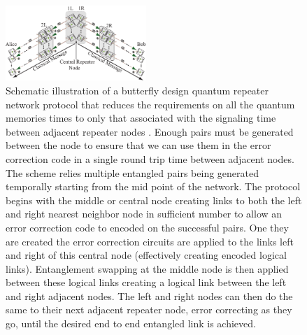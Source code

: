 \documentclass[twocolumn, aps, rmp, amsmath, amssymb, nofootinbib, superscriptaddress, longbibliography, floatfix, table-of-contents, eqsecnum]{revtex4-1}
\begin{document}
\begin{figure}[!htb]
\begin{center}
\includegraphics[width=0.475\textwidth]{repeaters_8}
\end{center}
\caption{
Schematic illustration of a butterfly design quantum repeater network protocol that reduces the requirements on all the quantum memories times  to only that associated with the signaling time between adjacent repeater nodes \cite{munro10}. Enough pairs must be generated between the node to ensure that we can use them in the error correction code in a single round trip time between adjacent nodes. The scheme relies multiple entangled pairs being generated temporally starting from the mid point of the network. The protocol begins with the middle or central node creating links to both the left and right nearest neighbor node in sufficient number to allow an error correction code to encoded on the successful pairs. One they are created the error correction circuits are applied to the links left and right of this central node (effectively creating encoded logical links). Entanglement swapping at the middle node is then applied  between these logical links creating a logical link between the left and right adjacent nodes. The left and right nodes can then do the same to their next adjacent repeater node, error correcting as they go, until the desired end to end entangled link is achieved.  }
\label{fig8}
\end{figure} 
\end{document}
